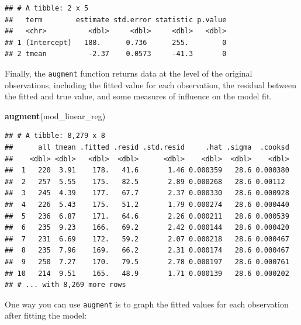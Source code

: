 \documentclass[
]{book}
\newenvironment{Shaded}{\begin{snugshade}}{\end{snugshade}}
\newcommand{\DataTypeTok}[1]{\textcolor[rgb]{0.13,0.29,0.53}{#1}}
\newcommand{\FloatTok}[1]{\textcolor[rgb]{0.00,0.00,0.81}{#1}}
\newcommand{\KeywordTok}[1]{\textcolor[rgb]{0.13,0.29,0.53}{\textbf{#1}}}
\newcommand{\NormalTok}[1]{#1}
\newcommand{\OperatorTok}[1]{\textcolor[rgb]{0.81,0.36,0.00}{\textbf{#1}}}
\newcommand{\StringTok}[1]{\textcolor[rgb]{0.31,0.60,0.02}{#1}}
\begin{document}
\begin{verbatim}
## # A tibble: 2 x 5
##   term        estimate std.error statistic p.value
##   <chr>          <dbl>     <dbl>     <dbl>   <dbl>
## 1 (Intercept)   188.      0.736      255.        0
## 2 tmean          -2.37    0.0573     -41.3       0
\end{verbatim}

Finally, the \texttt{augment} function returns data at the level of the original
observations, including the fitted value for each observation, the residual
between the fitted and true value, and some measures of influence on the model
fit.

\begin{Shaded}
\begin{Highlighting}[]
\KeywordTok{augment}\NormalTok{(mod_linear_reg)}
\end{Highlighting}
\end{Shaded}

\begin{verbatim}
## # A tibble: 8,279 x 8
##      all tmean .fitted .resid .std.resid     .hat .sigma  .cooksd
##    <dbl> <dbl>   <dbl>  <dbl>      <dbl>    <dbl>  <dbl>    <dbl>
##  1   220  3.91    178.   41.6       1.46 0.000359   28.6 0.000380
##  2   257  5.55    175.   82.5       2.89 0.000268   28.6 0.00112 
##  3   245  4.39    177.   67.7       2.37 0.000330   28.6 0.000928
##  4   226  5.43    175.   51.2       1.79 0.000274   28.6 0.000440
##  5   236  6.87    171.   64.6       2.26 0.000211   28.6 0.000539
##  6   235  9.23    166.   69.2       2.42 0.000144   28.6 0.000420
##  7   231  6.69    172.   59.2       2.07 0.000218   28.6 0.000467
##  8   235  7.96    169.   66.2       2.31 0.000174   28.6 0.000467
##  9   250  7.27    170.   79.5       2.78 0.000197   28.6 0.000761
## 10   214  9.51    165.   48.9       1.71 0.000139   28.6 0.000202
## # ... with 8,269 more rows
\end{verbatim}

One way you can use \texttt{augment} is to graph the fitted values for each observation
after fitting the model:

\begin{Shaded}
\end{Shaded}
\end{document}
